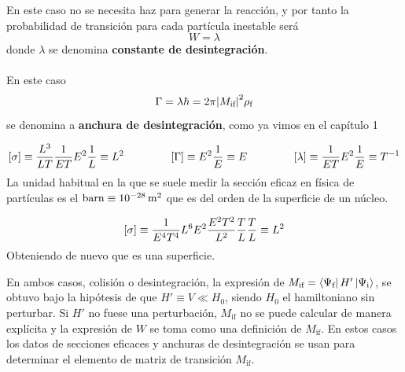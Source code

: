 En este caso no se necesita haz para generar la reacción, y por tanto la probabilidad de transición para cada partícula inestable será
\begin{equation}
    W=\lambda
    \label{eq: constante de desintegracion}
\end{equation}
donde $\lambda$ se denomina \textbf{constante de desintegración}.\\\\
En este caso 
\begin{equation}
    \Gamma=\lambda \hbar= 2\pi \abs{M_\text{if}}^2 \rho_\text{f}
    \label{eq: anchura de desintegracion}
\end{equation}
se denomina a \textbf{anchura de desintegración}, como ya vimos en el capítulo 1
\begin{tcolorbox}[colback=applegreen!20, colframe=applegreen, title={Análisis dimensional: Sección eficaz, constante y anchura de desintegración}]
\begin{equation*}
\begin{aligned}
        \qty[\sigma]\equiv \frac{L^3}{LT} \frac{1}{ET} E^2 \frac{1}{L}\equiv L^2 \hspace{1.5cm}
        \qty[\Gamma]\equiv E^2\frac{1}{E}\equiv E \hspace{1.5cm}
        \qty[\lambda]\equiv \frac{1}{ET}E^2 \frac{1}{E}\equiv T^{-1}
\end{aligned}
\end{equation*}
La unidad habitual en la que se suele medir la sección eficaz en física de partículas es el $\unit{barn}\equiv \unit[10^{-28}]{m^2}$ que es del orden de la superficie de un núcleo.

\begin{equation*}
        \qty[\sigma]\equiv \frac{1}{E^4T^4}L^6E^2 \frac{E^2T^2}{L^2} \frac{T}{L} \frac{T}{L}\equiv L^2 
\end{equation*}
Obteniendo de nuevo que es una superficie.
\end{tcolorbox}

En ambos casos, colisión o desintegración, la expresión de $M_\text{if}=\bra{\Psi_\text{f}}H'\ket{\Psi_\text{i}}$, se obtuvo bajo la hipótesis de que $H'\equiv V\ll H_0$, siendo $H_0$ el hamiltoniano sin perturbar. Si $H'$ no fuese una perturbación, $M_\text{if}$ no se puede calcular de manera explícita y la expresión de $W$ se toma como una definición de $M_\text{if}$. En estos casos los datos de secciones eficaces y anchuras de desintegración se usan para determinar el elemento de matriz de transición $M_\text{if}$.
